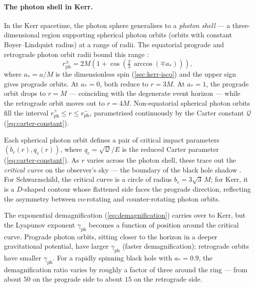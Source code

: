 \paragraph{The photon shell in Kerr.}

In the Kerr spacetime, the photon sphere generalises to a
\emph{photon shell} --- a three-dimensional region supporting
spherical photon orbits (orbits with constant Boyer--Lindquist radius)
at a range of radii.  The equatorial prograde and retrograde photon
orbit radii bound this range \cite{Bardeen1972}:
%
\begin{equation}
  r_{\text{ph}}^{\pm}
  = 2M\!\left(1 + \cos\!\left(
      \tfrac{2}{3}\,\arccos(\mp a_*)\right)\right) ,
  \label{eq:kerr-photon-radii}
\end{equation}
%
where $a_* = a/M$ is the dimensionless spin
(\cref{sec:kerr-isco}) and the upper sign gives prograde orbits.
At $a_* = 0$, both reduce to $r = 3M$.  At $a_* = 1$, the prograde
orbit drops to $r = M$ --- coinciding with the degenerate event
horizon --- while the retrograde orbit moves out to $r = 4M$.
Non-equatorial spherical photon orbits fill the interval
$r_{\text{ph}}^+ \leq r \leq r_{\text{ph}}^-$, parametrised
continuously by the Carter constant $\mathcal{Q}$
(\cref{eq:carter-constant}).

Each spherical photon orbit defines a pair of critical impact
parameters $(b_c(r), q_c(r))$, where
$q_c = \sqrt{\mathcal{Q}}/E$ is the reduced Carter parameter
(\cref{eq:carter-constant}).  As $r$ varies across the photon
shell, these trace out the \emph{critical curve} on the observer's
sky --- the boundary of the black hole shadow
\cite{Chandrasekhar1983}.  For Schwarzschild, the critical curve is a
circle of radius $b_c = 3\sqrt{3}\,M$; for Kerr, it is a
$D$-shaped contour whose flattened side faces the prograde direction,
reflecting the asymmetry between co-rotating and counter-rotating
photon orbits.

The exponential demagnification (\cref{eq:demagnification}) carries
over to Kerr, but the Lyapunov exponent $\gamma_{\text{ph}}$ becomes a
function of position around the critical curve.  Prograde photon orbits,
sitting closer to the horizon in a deeper gravitational potential,
have larger $\gamma_{\text{ph}}$ (faster demagnification); retrograde
orbits have smaller $\gamma_{\text{ph}}$.  For a rapidly spinning black
hole with $a_* = 0.9$, the demagnification ratio varies by roughly a
factor of three around the ring --- from about $50$ on the prograde side
to about $15$ on the retrograde side.

